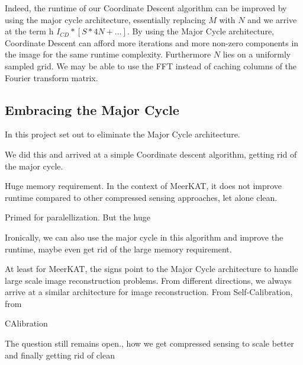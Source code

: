 Indeed, the runtime of our Coordinate Descent algorithm can be improved by using the major cycle architecture, essentially replacing $M$ with $N$ and we arrive at the term
h $I_{CD} * [S * 4N +\ldots]$. By using the Major Cycle architecture, Coordinate Descent can afford more iterations and more non-zero components in the image for the same runtime complexity. Furthermore $N$ lies on a uniformly sampled grid. We may be able to use the FFT instead of caching columns of the Fourier transform matrix.


\subsection{Embracing the Major Cycle}
In this project set out to eliminate the Major Cycle architecture. 

We did this and arrived at a simple Coordinate descent algorithm, getting rid of the major cycle. 

Huge memory requirement. In the context of MeerKAT, it does not improve runtime compared to other compressed sensing approaches, let alone clean.

Primed for paralellization. But the huge

Ironically, we can also use the major cycle in this algorithm and improve the runtime, maybe even get rid of the large memory requirement.

At least for MeerKAT, the signs point to the Major Cycle architecture to handle large scale image reconstruction problems. From different directions, we always arrive at a similar architecture for image reconstruction. From Self-Calibration, from


CAlibration 


The question still remains open., how we get compressed sensing to scale better and finally getting rid of clean

 
